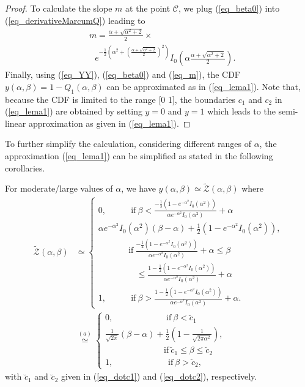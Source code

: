 \begin{proof}
To calculate the slope $m$ at the point $\mathcal{C}$, we plug (\ref{eq_beta0}) into (\ref{eq_derivativeMarcumQ}) leading to
\begin{align}\label{eq_m}
   & m = \frac{\alpha+\sqrt{\alpha^2+2}}{2}\times\nonumber\\
    & ~~~e^{-\frac{1}{2}\left(\alpha^2+\left(\frac{\alpha+\sqrt{\alpha^2+2}}{2}\right)^2\right)}I_0\left(\alpha\frac{\alpha+\sqrt{\alpha^2+2}}{2}\right).
\end{align}
Finally, using (\ref{eq_YY}), (\ref{eq_beta0}) and (\ref{eq_m}), the CDF $y(\alpha, \beta) = 1-Q_1(\alpha,\beta)$ can be approximated  as in (\ref{eq_lema1}). Note that, because the CDF is limited to the range [0 1], the boundaries $c_1$ and $c_2$ in (\ref{eq_lema1}) are obtained by setting $y=0$ and $y=1$ which leads to the semi-linear approximation as given in (\ref{eq_lema1}).
\end{proof}


To further simplify the calculation, considering different ranges of $\alpha$, the approximation (\ref{eq_lema1}) can be simplified as stated in the following corollaries. 

\begin{corollary}\label{coro1}
For moderate/large values of $\alpha$, we have $y(\alpha,\beta)\simeq\tilde{\mathcal{Z}}(\alpha,\beta)$ where
\begin{align}\label{eq_coro1}
\tilde{\mathcal{Z}}(\alpha,\beta)&\simeq
\begin{cases}
0,  ~~~~~~~~~~~~~\mathrm{if}~\beta < \frac{-\frac{1}{2}\left(1-e^{-\alpha^2}I_0(\alpha^2)\right)}{\alpha e^{-\alpha^2}I_0(\alpha^2)}+\alpha  \\ 
\alpha e^{-\alpha^2}I_0(\alpha^2)(\beta-\alpha) + 
\frac{1}{2}\left(1-e^{-\alpha^2}I_0(\alpha^2)\right), \\ ~~~~~~~~~~~~~~~~\mathrm{if}~\frac{-\frac{1}{2}\left(1-e^{-\alpha^2}I_0(\alpha^2)\right)}{\alpha e^{-\alpha^2}I_0(\alpha^2)}+\alpha \leq\beta\\
~~~~~~~~~~~~~~~~~~~~\leq\frac{1-\frac{1}{2}\left(1-e^{-\alpha^2}I_0(\alpha^2)\right)}{\alpha e^{-\alpha^2}I_0(\alpha^2)}+\alpha \\
1,  ~~~~~~~~~~~~~\mathrm{if}~ \beta> \frac{1-\frac{1}{2}\left(1-e^{-\alpha^2}I_0(\alpha^2)\right)}{\alpha e^{-\alpha^2}I_0(\alpha^2)}+\alpha.
\end{cases}\\
&\overset{(a)}{\simeq}
\begin{cases}
0, ~~~~~~~~~~~~~~~~~~~~~~~~~~~~\mathrm{if}~  \beta < \breve{c}_1  \\ 
\frac{1}{\sqrt{2\pi}}(\beta-\alpha) + 
\frac{1}{2}\left(1-\frac{1}{\sqrt{2\pi\alpha^2}}\right), \\~~~~~~~~~~~~~~~~~~~~~~~~~~~~~~~\mathrm{if}~  \breve{c}_1 \leq\beta\leq \breve{c}_2 \\
1, ~~~~~~~~~~~~~~~~~~~~~~~~~~~~~\mathrm{if}~ \beta>\breve{c}_2,
\end{cases}
\end{align}
with $\breve{c}_1$ and $\breve{c}_2$ given in (\ref{eq_dotc1}) and (\ref{eq_dotc2}), respectively.
\end{corollary}

